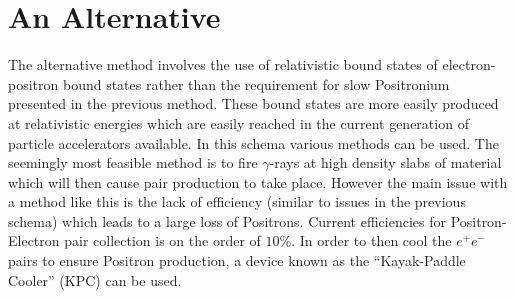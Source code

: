 \section{An Alternative}
The alternative method involves the use of relativistic bound states of electron-positron bound states rather than the requirement for slow Positronium presented in the previous method. These bound states are more easily produced at relativistic energies which are easily reached in the current generation of particle accelerators available. In this schema various methods can be used. The seemingly most feasible method is to fire $\gamma$-rays at high density slabs of material which will then cause pair production to take place. However the main issue with a method like this is the lack of efficiency (similar to issues in the previous schema) which leads to a large loss of Positrons. Current efficiencies for Positron-Electron pair collection is on the order of $10\%$. In order to then cool the $e^+e^-$ pairs to ensure Positron production, a device known as the “Kayak-Paddle Cooler” (KPC) can be used. 
\newline
\newline
